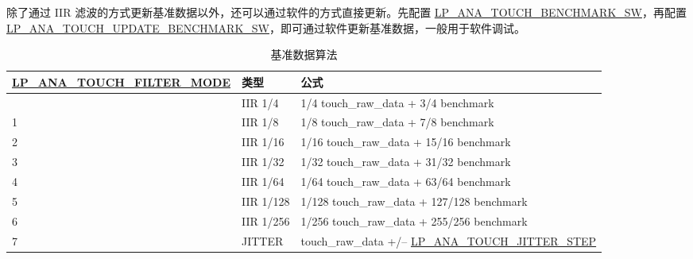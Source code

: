 \documentclass[main\_\_CN.tex]{subfiles}
\begin{document}
\begin{enumerate}
    {除了通过 IIR 滤波的方式更新基准数据以外，还可以通过软件的方式直接更新。先配置 \hyperref[fielddesc:LPANATOUCHBENCHMARKSW]{LP\_ANA\_TOUCH\_BENCHMARK\_SW}，再配置 \hyperref[fielddesc:LPANATOUCHUPDATEBENCHMARKSW]{LP\_ANA\_TOUCH\_UPDATE\_BENCHMARK\_SW}，即可通过软件更新基准数据，一般用于软件调试。}

\end{enumerate}

\begin{longtable}[c]{|p{5.5 cm}|p{1.5cm}|p{8.5cm}|}
    \caption{基准数据算法}\label{tab:benchmark-cal}\\
    \hline
    \rowcolor{lightgray}
    \textbf{\hyperref[fielddesc:LPANATOUCHFILTERMODE]{LP\_ANA\_TOUCH\_FILTER\_MODE}} & \textbf{类型} & \textbf{公式}\\ 
    \hline
    \endhead
    \endfoot
    \endlastfoot
    0  &  IIR 1/4 & 1/4 touch\_raw\_data + 3/4 benchmark \\\hline
    1  &  IIR 1/8 & 1/8 touch\_raw\_data + 7/8 benchmark \\\hline
    2  &  IIR 1/16 & 1/16 touch\_raw\_data + 15/16 benchmark \\\hline
    3  &  IIR 1/32 & 1/32 touch\_raw\_data + 31/32 benchmark \\\hline
    4  &  IIR 1/64 & 1/64 touch\_raw\_data + 63/64 benchmark \\\hline
    5  &  IIR 1/128 & 1/128 touch\_raw\_data + 127/128 benchmark \\\hline
    6  &  IIR 1/256 & 1/256 touch\_raw\_data + 255/256 benchmark \\\hline
    7  &  JITTER & touch\_raw\_data +/$–$ \hyperref[fielddesc:LPANATOUCHJITTERSTEP]{LP\_ANA\_TOUCH\_JITTER\_STEP} \\\hline
\end{longtable}
\end{document}
